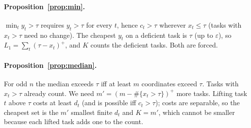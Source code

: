 \documentclass{article}
\begin{document}
\paragraph{Proposition~\ref{prop:min}.} $\min_t y_t>\tau$ requires $y_t>\tau$ for every $t$, hence $c_t>\tau$ wherever $x_t\le\tau$ (tasks with $x_t>\tau$ need no change). The cheapest $y_t$ on a deficient task is $\tau$ (up to $\varepsilon$), so $L_1=\sum_t(\tau-x_t)^+$, and $K$ counts the deficient tasks. Both are forced.
\paragraph{Proposition~\ref{prop:median}.} For odd $n$ the median exceeds $\tau$ iff at least $m$ coordinates exceed $\tau$. Tasks with $x_t>\tau$ already count. We need $m'=(m-\#\{x_t>\tau\})^+$ more tasks. Lifting task $t$ above $\tau$ costs at least $d_t$ (and is possible iff $c_t>\tau$); costs are separable, so the cheapest set is the $m'$ smallest finite $d_t$ and $K=m'$, which cannot be smaller because each lifted task adds one to the count.
\end{document}

